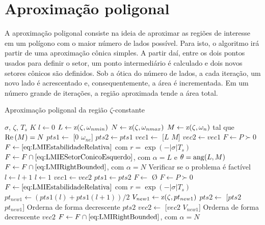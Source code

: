 \section{Aproximação poligonal}
A aproximação poligonal consiste na ideia de aproximar as regiões de interesse em um polígono com o maior número de lados possível. Para isto, o algoritmo irá partir de uma aproximação cônica simples. A partir daí, entre os dois pontos usados para definir o setor, um ponto intermediário é calculado e dois novos setores cônicos são definidos.
Sob a ótica do número de lados, a cada iteração, um novo lado é acrescentado e, consequentemente, a área é incrementada. Em um número grande de iterações, a região aproximada tende a área total.
\begin{algorithm}[ht!]
  \caption{Aproximação poligonal da região $\zeta$-constante}\label{alg:AproximacaoPoligonalZeta}
  \begin{algorithmic}[1]
    \Require $\sigma$, $\zeta$, $T_s$
    \Ensure $K$
    \State $l \gets 0$
    \State $L \gets \operatorname{\mathrm{z}}(\zeta,\omega_{nmin})$
    \State $N \gets \operatorname{\mathrm{z}}(\zeta,\omega_{nmax})$
    \State $M \gets \operatorname{\mathrm{z}}(\zeta,\omega_n)$ tal que $\operatorname{Re}{(M)} = N$
    \State $pts1 \gets$ [$0$ $\omega_{ne}$]
    \State $pts2 \gets pts1$
    \State $vec1 \gets$ [$L$ $M$]
    \State $vec2 \gets vec1$
    \State $F \gets P \succ 0$
    \State $F \gets \eqref{eq:LMIEstabilidadeRelativa}$ com $r = \exp{\left(-|\sigma|T_s\right)}$ 
    \State $F \gets F \cap \eqref{eq:LMIESetorConicoEsquerdo}$, com $\alpha = L$ e $\theta = \operatorname{ang}(L,M)$ 
    \State $F \gets F \cap \eqref{eq:LMIRightBounded}$, com $\alpha = N$ 
    \State Verificar se o problema é factível
        \State $l \gets l + 1$
      \Else
        \State $l \gets 1$
        \State $vec1 \gets vec2$
        \State $pts1 \gets pts2$
      \EndIf
        \State $F \gets$ \O {}
        \State $F \gets P \succ 0$
        \State $F \gets \eqref{eq:LMIEstabilidadeRelativa}$ com $r = \exp{\left(-|\sigma|T_s\right)}$ 
        \State $pt_{new1} \gets (pts1(l)+pts1(l+1))/2$
        \State $V_{new1} \gets \operatorname{\mathrm{z}}(\zeta, pt_{new1})$
        \State $pts2 \gets$ [$pts2$ $pt_{new1}$]
        \State Orderna de forma decrescente $pts2$
        \State $vec2 \gets$ [$vec2$ $V_{new1}$]
        \State Orderna de forma decrescente $vec2$
        \State $F \gets F \cap \eqref{eq:LMIRightBounded}$, com $\alpha = N$ 

\end{algorithmic}
\end{algorithm}
